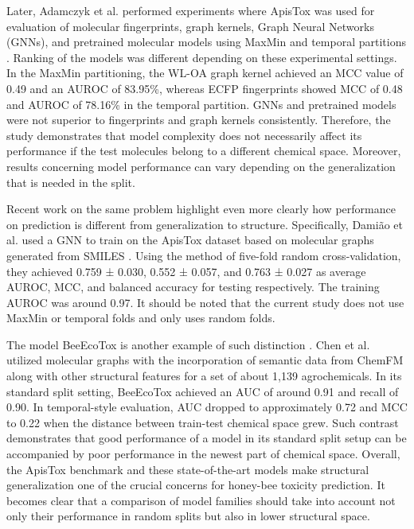 \documentclass[conference]{IEEEtran}
\begin{document}
Later, Adamczyk et al. performed experiments where ApisTox was used for evaluation of molecular fingerprints, graph kernels, Graph Neural Networks (GNNs), and pretrained molecular models using MaxMin and temporal partitions \cite{adamczyk2026evaluating}. Ranking of the models was different depending on these experimental settings. In the MaxMin partitioning, the WL-OA graph kernel achieved an MCC value of 0.49 and an AUROC of 83.95\%, whereas ECFP fingerprints showed MCC of 0.48 and AUROC of 78.16\% in the temporal partition. GNNs and pretrained models were not superior to fingerprints and graph kernels consistently. Therefore, the study demonstrates that model complexity does not necessarily affect its performance if the test molecules belong to a different chemical space. Moreover, results concerning model performance can vary depending on the generalization that is needed in the split.

Recent work on the same problem highlight even more clearly how performance on prediction is different from generalization to structure. Specifically, Damião et al. used a GNN to train on the ApisTox dataset based on molecular graphs generated from SMILES \cite{damiao2025newgeneration}. Using the method of five-fold random cross-validation, they achieved 0.759 ± 0.030, 0.552 ± 0.057, and 0.763 ± 0.027 as average AUROC, MCC, and balanced accuracy for testing respectively. The training AUROC was around 0.97. It should be noted that the current study does not use MaxMin or temporal folds and only uses random folds.

The model BeeEcoTox is another example of such distinction \cite{chen2026beeecotox}. Chen et al. utilized molecular graphs with the incorporation of semantic data from ChemFM along with other structural features for a set of about 1,139 agrochemicals. In its standard split setting, BeeEcoTox achieved an AUC of around 0.91 and recall of 0.90. In temporal-style evaluation, AUC dropped to approximately 0.72 and MCC to 0.22 when the distance between train-test chemical space grew. Such contrast demonstrates that good performance of a model in its standard split setup can be accompanied by poor performance in the newest part of chemical space. Overall, the ApisTox benchmark and these state-of-the-art models make structural generalization one of the crucial concerns for honey-bee toxicity prediction. It becomes clear that a comparison of model families should take into account not only their performance in random splits but also in lower structural space.
\end{document}
